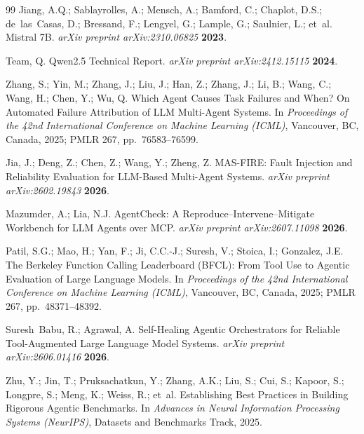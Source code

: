 \documentclass[make,article,submit,moreauthors,pdftex]{mdpi}
\begin{document}
\begin{thebibliography}{99}
Jiang, A.Q.; Sablayrolles, A.; Mensch, A.; Bamford, C.; Chaplot, D.S.; de~las~Casas, D.; Bressand, F.; Lengyel, G.; Lample, G.; Saulnier, L.; et~al.
\newblock Mistral 7B.
\newblock \textit{arXiv preprint arXiv:2310.06825} \textbf{2023}.

Team, Q.
\newblock Qwen2.5 Technical Report.
\newblock \textit{arXiv preprint arXiv:2412.15115} \textbf{2024}.

Zhang, S.; Yin, M.; Zhang, J.; Liu, J.; Han, Z.; Zhang, J.; Li, B.; Wang, C.; Wang, H.; Chen, Y.; Wu, Q.
\newblock Which Agent Causes Task Failures and When? On Automated Failure Attribution of LLM Multi-Agent Systems.
\newblock In \textit{Proceedings of the 42nd International Conference on Machine Learning (ICML)}, Vancouver, BC, Canada, 2025; PMLR 267, pp.~76583--76599.

Jia, J.; Deng, Z.; Chen, Z.; Wang, Y.; Zheng, Z.
\newblock MAS-FIRE: Fault Injection and Reliability Evaluation for LLM-Based Multi-Agent Systems.
\newblock \textit{arXiv preprint arXiv:2602.19843} \textbf{2026}.

Mazumder, A.; Lia, N.J.
\newblock AgentCheck: A Reproduce--Intervene--Mitigate Workbench for LLM Agents over MCP.
\newblock \textit{arXiv preprint arXiv:2607.11098} \textbf{2026}.

Patil, S.G.; Mao, H.; Yan, F.; Ji, C.C.-J.; Suresh, V.; Stoica, I.; Gonzalez, J.E.
\newblock The Berkeley Function Calling Leaderboard (BFCL): From Tool Use to Agentic Evaluation of Large Language Models.
\newblock In \textit{Proceedings of the 42nd International Conference on Machine Learning (ICML)}, Vancouver, BC, Canada, 2025; PMLR 267, pp.~48371--48392.

Suresh~Babu, R.; Agrawal, A.
\newblock Self-Healing Agentic Orchestrators for Reliable Tool-Augmented Large Language Model Systems.
\newblock \textit{arXiv preprint arXiv:2606.01416} \textbf{2026}.

Zhu, Y.; Jin, T.; Pruksachatkun, Y.; Zhang, A.K.; Liu, S.; Cui, S.; Kapoor, S.; Longpre, S.; Meng, K.; Weiss, R.; et~al.
\newblock Establishing Best Practices in Building Rigorous Agentic Benchmarks.
\newblock In \textit{Advances in Neural Information Processing Systems (NeurIPS)}, Datasets and Benchmarks Track, 2025.

\end{thebibliography}
\end{document}
